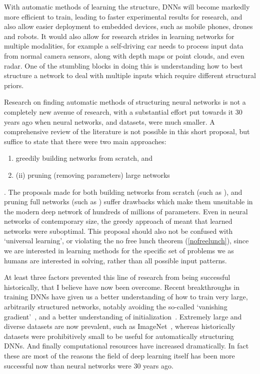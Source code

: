 \documentclass[thesis]{subfiles}
\begin{document}
With automatic methods of learning the structure, DNNs will become markedly more efficient to train, leading to faster experimental results for research, and also allow easier deployment to embedded devices, such as mobile phones, drones and robots. It would also allow for research strides in learning networks for multiple modalities, for example a self-driving car needs to process input data from normal camera sensors, along with depth maps or point clouds, and even radar. One of the stumbling blocks in doing this is understanding how to best structure a network to deal with multiple inputs which require different structural priors.

Research on finding automatic methods of structuring neural networks is not a completely new avenue of research, with a substantial effort put towards it 30 years ago when neural networks, and datasets, were much smaller. A comprehensive review of the literature is not possible in this short proposal, but suffice to state that there were two main approaches:
\begin{enumerate}[(\textbf{\roman*})]
	\item greedily building networks from scratch, and 
	\item(ii) pruning (removing parameters) large networks
\end{enumerate}. The proposals made for both building networks from scratch (such as \citep{Fahlman1989}), and pruning full networks (such as \citep{lecun1989optimal}) suffer drawbacks which make them unsuitable in the modern deep network of hundreds of millions of parameters. Even in neural networks of contemporary size, the greedy approach of \citet{Fahlman1989} meant that learned networks were suboptimal. This proposal should also not be confused with `universal learning', or violating the no free lunch theorem (\cref{nofreelunch}), since we are interested in learning methods for the specific set of problems we as humans are interested in solving, rather than all possible input patterns.

At least three factors prevented this line of research from being successful historically, that I believe have now been overcome. Recent breakthroughs in training DNNs have given us a better understanding of how to train very large, arbitrarily structured networks, notably avoiding the so-called `vanishing gradient'~\citep{Ioffe2015,He2016}, and a better understanding of initialization~\citep{He2015b}. Extremely large and diverse datasets are now prevalent, such as ImageNet~\citep{ILSVRC2015}, whereas historically datasets were prohibitively small to be useful for automatically structuring DNNs. And finally computational resources have increased dramatically. In fact these are most of the reasons the field of deep learning itself has been more successful now than neural networks were 30 years ago.
\end{document}
